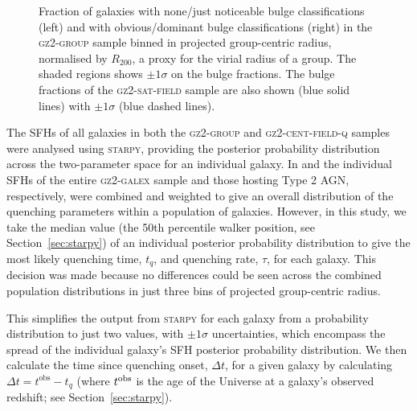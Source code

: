 \documentclass[useAMS,usenatbib]{mn2e}
\begin{document}
\begin{figure}
\caption[Bulge fraction with group radius in the \textsc{gz2-group} sample]{Fraction of galaxies with none/just noticeable bulge classifications (left) and with obvious/dominant bulge classifications (right) in the \textsc{gz2-group} sample binned in projected group-centric radius, normalised by $R_{200}$, a proxy for the virial radius of a group. The shaded regions shows $\pm1\sigma$ on the bulge fractions. The bulge fractions of the \textsc{gz2-sat-field} sample are also shown (blue solid lines) with $\pm1\sigma$ (blue dashed lines).}
\label{fig:bulgeradius}
\end{figure}

The SFHs of all galaxies in both the \textsc{gz2-group} and \textsc{gz2-cent-field-q} samples were analysed using \textsc{starpy}, providing the posterior probability distribution across the two-parameter space for an individual galaxy. In \cite{smethurst15} and \cite{smethurst16} the individual SFHs of the entire \textsc{gz2-galex} sample and those hosting Type 2 AGN, respectively, were combined and weighted to give an overall distribution of the quenching parameters within a population of galaxies. However, in this study, we take the median value (the 50th percentile walker position, see Section~\ref{sec:starpy}) of an individual posterior probability distribution to give the most likely quenching time, $t_{q}$, and quenching rate, $\tau$, for each galaxy. This decision was made because no differences could be seen across the combined population distributions in just three bins of projected group-centric radius.

This simplifies the output from \textsc{starpy} for each galaxy from a probability distribution to just two values, with $\pm1\sigma$ uncertainties, which encompass the spread of the individual galaxy's SFH posterior probability distribution. We then calculate the time since quenching onset, $\Delta t$, for a given galaxy by calculating {\bf $\Delta t = t^\mathrm{obs} - t_{q}$} (where $t^{\rm{obs}}$ is the age of the Universe at a galaxy's observed redshift; see Section~\ref{sec:starpy}). 
\end{document}
